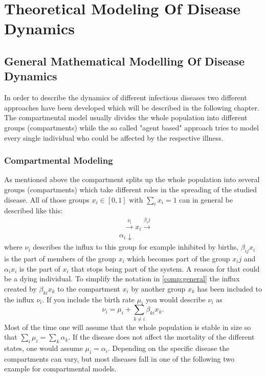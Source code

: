\chapter{Theoretical Modeling Of Disease Dynamics} 
\section{General Mathematical Modelling Of Disease Dynamics}
In order to describe the dynamics of different infectious diseases two different approaches have been developed which will be described in the following chapter.
The compartmental model usually divides the whole population into different groups (compartments) while the so called "agent based" approach tries to model every single individual who could be affected by the respective illness. 
\subsection{Compartmental Modeling}
As mentioned above the compartment splits up the whole population into several groups (compartments) which take different roles in the spreading of the studied disease.
All of those groups $x_i \in [0,1] \text{ with } \sum_i x_i =1 $ can in general be described like this:
\begin{eqnarray}
&\text{     }\xrightarrow{\nu_i}  x_i \xrightarrow{\beta_ij}   \label{comp:general} \\
&{\alpha_i} \downarrow  \nonumber
\end{eqnarray}
where $\nu_i$ describes the influx to this group for example inhibited by births, $\beta_{ij} x_i$ is the part of members of the group $x_i$ which becomes part of the group $x_ij$ and $\alpha_i x_i$ is the part of $x_i$ that stops being part of the system. A reason for that could be a dying individual. To simplify the notation in \ref{comp:general} the influx created by $\beta_{ki} x_k$ to the compartment $x_i$ by another group $x_k$ has been included to the influx $\nu_i$. If you include the birth rate $\mu_i$ you would describe $\nu_i$ as 
\begin{equation}
\nu_i = \mu_i + \sum_{k\neq i}{}\beta_{ki} x_k.
\end{equation}
Most of the time one will assume that the whole population is stable in size so that $\sum_i \mu_i = \sum_{k} \alpha_k$. If the disease does not affect the mortality of the different states, one would assume $\mu_i = \alpha_i$.
Depending on the specific disease the compartments can vary, but most diseases fall in one of the following two example for compartmental models.
